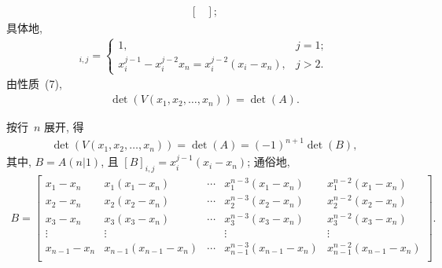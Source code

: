 \documentclass[../libro.tex]{subfiles}
\begin{document}
\begin{example}
\begin{align*}
\begin{bmatrix}
        \end{bmatrix};
    \end{align*}
    具体地,
    \begin{align*}
        [A]_{i,j} =
        \begin{cases}
            1,
            & j = 1; \\
            x_i^{j-1} - x_i^{j-2} x_n
            = x_i^{j-2} (x_i - x_n),
            & j > 2.
        \end{cases}
    \end{align*}
    由性质~(7),
    \begin{align*}
        \det {(V(x_1, x_2, \dots, x_n))} = \det {(A)}.
    \end{align*}

    按行~\(n\) 展开, 得
    \begin{align*}
        \det {(V(x_1, x_2, \dots, x_n))}
        = \det {(A)}
        = (-1)^{n+1} \det {(B)},
    \end{align*}
    其中, \(B = A(n|1)\),
    且 \([B]_{i,j} = x_i^{j-1} (x_i - x_n)\);
    通俗地,
    \begin{align*}
        B =
        \begin{bmatrix}
            x_1 - x_n     & x_1 (x_1 - x_n)         & \cdots & x_1^{n-3} (x_1 - x_n)         & x_1^{n-2} (x_1 - x_n)         \\
            x_2 - x_n     & x_2 (x_2 - x_n)         & \cdots & x_2^{n-3} (x_2 - x_n)         & x_2^{n-2} (x_2 - x_n)         \\
            x_3 - x_n     & x_3 (x_3 - x_n)         & \cdots & x_3^{n-3} (x_3 - x_n)         & x_3^{n-2} (x_3 - x_n)         \\
            \vdots        & \vdots                  & {}     & \vdots                        & \vdots                        \\
            x_{n-1} - x_n & x_{n-1} (x_{n-1} - x_n) & \cdots & x_{n-1}^{n-3} (x_{n-1} - x_n) & x_{n-1}^{n-2} (x_{n-1} - x_n) \\
        \end{bmatrix}.
    \end{align*}


\end{example}
\end{document}
